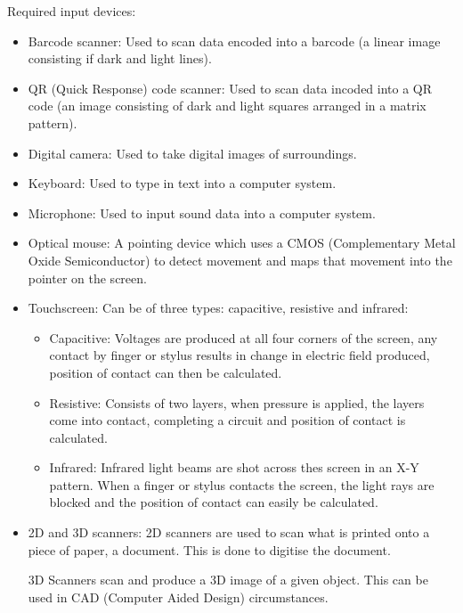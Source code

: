 \documentclass{article}
\begin{document}
Required input devices:
\begin{itemize}
	\item Barcode scanner: Used to scan data encoded into a barcode (a linear image 
		consisting if dark and light lines).
	\item QR (Quick Response) code scanner: Used to scan data incoded into a QR code (an
		image consisting of dark and light squares arranged in a matrix pattern).
	\item Digital camera: Used to take digital images of surroundings.
	\item Keyboard: Used to type in text into a computer system.
	\item Microphone: Used to input sound data into a computer system.
	\item Optical mouse: A pointing device which uses a CMOS (Complementary Metal Oxide
		Semiconductor) to detect movement and maps that movement into the pointer on
		the screen.
	\item Touchscreen: Can be of three types: capacitive, resistive and infrared:
		\begin{itemize}
			\item Capacitive: Voltages are produced at all four corners of the screen,
				any contact by finger or stylus results in change in electric field 
				produced, position of contact can then be calculated.
			\item Resistive: Consists of two layers, when pressure is applied, the layers
				come into contact, completing a circuit and position of contact is
				calculated.
			\item Infrared: Infrared light beams are shot across thes screen in an X-Y
				pattern. When a finger or stylus contacts the screen, the light rays are
				blocked and the position of contact can easily be calculated.
		\end{itemize}

	\item 2D and 3D scanners: 2D scanners are used to scan what is printed onto a piece
		of paper, a document. This is done to digitise the document.

		3D Scanners scan and produce a 3D image of a given object. This can be used in
		CAD (Computer Aided Design) circumstances.
\end{itemize}
\end{document}
